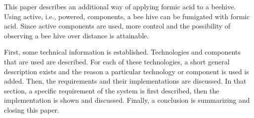 This paper describes an additional way of applying formic acid to a beehive.
Using active, i.e., powered, components, a bee hive can be fumigated with formic acid.
Since active components are used, more control and the possibility of observing a bee hive over distance is attainable.

First, some technical information is established.
Technologies and components that are used are described.
For each of these technologies, a short general description exists and the reason a particular technology or component is used is added.
Then, the requirements and their implementations are discussed.
In that section, a specific requirement of the system is first described, then the implementation is shown and discussed.
Finally, a conclusion is summarizing and closing this paper.
